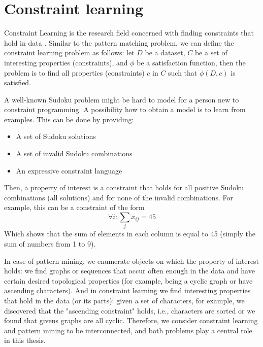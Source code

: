 \section{Constraint learning}
Constraint Learning is the research field concerned with finding
constraints that hold in data \parencite{constraint_learning,QUACQ,Conacq}.
Similar to the pattern matching problem, we can define 
the constraint learning problem as follows:
let $D$ be a dataset, $C$ be a set of interesting properties (constraints), and
$\phi$ be a satisfaction function, 
then the problem is to find all properties (constraints) $c$ in $C$ such that $\phi(D,c)$ is satisfied.
\begin{example}
    A well-known Sudoku problem might be hard to model for a person
    new to constraint programming. A possibility how to obtain a model
    is to learn from examples. This can be done by providing:
    \begin{itemize}
        \item A set of Sudoku solutions
        \item A set of invalid Sudoku combinations
        \item An expressive constraint language 
    \end{itemize}
Then, a property of interest is a constraint that holds for all
    positive Sudoku combinations (all solutions) and for none of
    the invalid combinations. For example, this can be a constraint of
    the form
\begin{equation*}
    \forall i: \sum_j x_{ij} = 45
\end{equation*}
    Which shows that the sum of elements in each column is equal to 45
    (simply the sum of numbers from 1 to 9).
\end{example}

In case of pattern mining, we enumerate objects on which the property
of interest holds: we find graphs or sequences that occur often enough
in the data and have certain desired topological properties (for example, being a
cyclic graph or have ascending characters). And in constraint learning we find interesting
properties that hold in the data (or its parts): given a set of
characters, for example, we discovered that the "ascending constraint" holds, i.e.,
characters are sorted or we found that givens graphs are all cyclic.
Therefore, we consider constraint learning and pattern mining to be interconnected, and both problems play a central role in this thesis.


